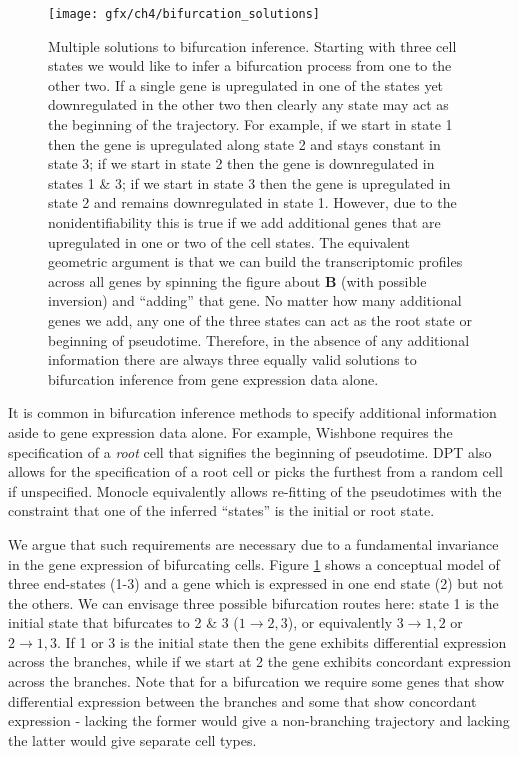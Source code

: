\begin{figure}%
	\centering
	\texttt{[image: gfx/ch4/bifurcation\_solutions]}
	\caption{Multiple solutions to bifurcation inference.
{\normalfont
Starting with three cell states we would like to infer a bifurcation process from one to the other two. If a single gene is upregulated in one of the states yet downregulated in the other two then clearly any state may act as the beginning of the trajectory. For example, if we start in state 1 then the gene is upregulated along state 2 and stays constant in state 3; if we start in state 2 then the gene is downregulated in states 1 \& 3; if we start in state 3 then the gene is upregulated in state 2 and remains downregulated in state 1.  However, due to the nonidentifiability this is true if we add additional genes that are upregulated in one or two of the cell states. The equivalent geometric argument is that we can build the transcriptomic profiles across all genes by spinning the figure about \textbf{B} (with possible inversion) and ``adding'' that gene. No matter how many additional genes we add, any one of the three states can act as the root state or beginning of pseudotime. Therefore, in the absence of any additional information there are always three equally valid solutions to bifurcation inference from gene expression data alone.
}
	} \label{fig:multisol}
\end{figure}

It is common in bifurcation inference methods to specify additional information aside to gene expression data alone.
For example, Wishbone requires the specification of a \emph{root} cell that signifies the beginning of pseudotime. %
DPT also allows for the specification of a root cell or picks the furthest from a random cell if unspecified.
Monocle equivalently allows re-fitting of the pseudotimes with the constraint that one of the inferred ``states'' is the initial or root state.

We argue that such requirements are necessary due to a fundamental invariance in the gene expression of bifurcating cells. Figure \ref{fig:multisol} shows a conceptual model of three end-states (1-3) and a  gene which is expressed in one end state (2) but not the others. We can envisage three possible bifurcation routes here: state 1 is the initial state that bifurcates to 2 \& 3 ($1 \rightarrow 2,3$), or equivalently $3 \rightarrow 1,2$ or $2 \rightarrow 1,3$. If 1 or 3 is the initial state then the gene exhibits differential expression across the branches, while if we start at 2 the gene exhibits concordant expression across the branches. Note that for a bifurcation we require some genes that show differential expression between the branches and some that show concordant expression - lacking the former would give a non-branching trajectory and lacking the latter would give separate cell types.

